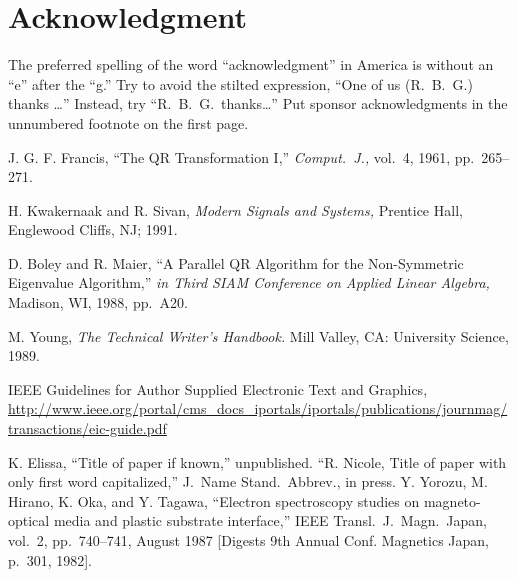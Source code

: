 \documentclass[a4paper,conference]{IEEEtran}
\begin{document}
\section*{Acknowledgment}
The preferred spelling of the word ``acknowledgment'' in America is without an ``e'' after the ``g.''  Try to avoid the stilted expression, ``One of us (R.~B.~G.) thanks \dots'' Instead, try ``R.~B.~G.\ thanks\dots''  Put sponsor acknowledgments in the unnumbered footnote on the first page.


\begin{thebibliography}{99}

J. G. F. Francis, ``The QR Transformation I,'' {\it Comput.\ J.,} vol.~4, 1961, pp.~265--271.

H. Kwakernaak and R. Sivan, {\it Modern Signals and Systems,} Prentice Hall, Englewood Cliffs, NJ; 1991.

D. Boley and R. Maier, ``A Parallel QR Algorithm for the Non-Symmetric Eigenvalue Algorithm,'' {\it in Third SIAM Conference on Applied Linear Algebra,} Madison, WI, 1988, pp.~A20.


M. Young, {\it The Technical Writer's Handbook.} Mill Valley, CA:  University Science, 1989.

IEEE Guidelines for Author
Supplied Electronic
Text and Graphics, \url{http://www.ieee.org/portal/cms_docs_iportals/iportals/publications/journmag/transactions/eic-guide.pdf}

 K. Elissa, ``Title of paper if known,'' unpublished.
 ``R. Nicole, Title of paper with only first word capitalized,'' J.\ Name Stand.\ Abbrev., in press.
 Y. Yorozu, M. Hirano, K. Oka, and Y. Tagawa, ``Electron spectroscopy studies on magneto-optical media and plastic substrate interface,'' IEEE Transl.\ J.\ Magn.\ Japan, vol.~2, pp.~740--741, August 1987 [Digests 9th Annual Conf. Magnetics Japan, p.~301, 1982].

\end{thebibliography}
\end{document}
